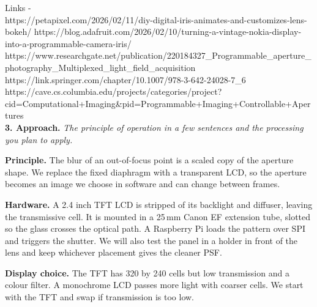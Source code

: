 Links - \\
https://petapixel.com/2026/02/11/diy-digital-iris-animates-and-customizes-lens-bokeh/
https://blog.adafruit.com/2026/02/10/turning-a-vintage-nokia-display-into-a-programmable-camera-iris/
https://www.researchgate.net/publication/220184327_Programmable_aperture_photography_Multiplexed_light_field_acquisition
https://link.springer.com/chapter/10.1007/978-3-642-24028-7_6
https://cave.cs.columbia.edu/projects/categories/project?cid=Computational+Imaging&pid=Programmable+Imaging+Controllable+Apertures
\\

\vspace{0.5em}
\vspace{0.5em}
\noindent\textbf{3. Approach.} \textit{The principle of operation in a few sentences and the processing you plan to apply.}

\vspace{0.5em}
\noindent\textbf{Principle.} The blur of an out-of-focus point is a scaled copy of the aperture shape. We replace the fixed diaphragm with a transparent LCD, so the aperture becomes an image we choose in software and can change between frames.

\vspace{0.5em}
\noindent\textbf{Hardware.} A 2.4 inch TFT LCD is stripped of its backlight and diffuser, leaving the transmissive cell. It is mounted in a 25\,mm Canon EF extension tube, slotted so the glass crosses the optical path. A Raspberry Pi loads the pattern over SPI and triggers the shutter. We will also test the panel in a holder in front of the lens and keep whichever placement gives the cleaner PSF.

\vspace{0.5em}
\noindent\textbf{Display choice.} The TFT has 320 by 240 cells but low transmission and a colour filter. A monochrome LCD passes more light with coarser cells. We start with the TFT and swap if transmission is too low.

